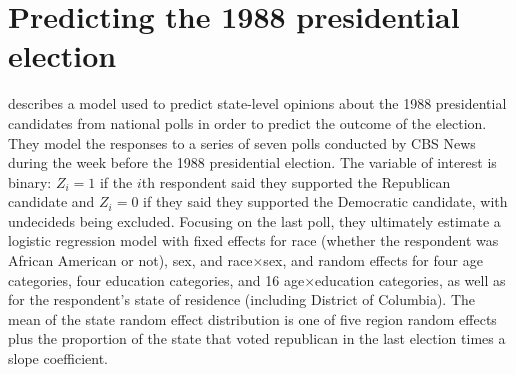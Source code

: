 \documentclass[12pt]{article}
\begin{document}
\section{Predicting the 1988 presidential election}\label{sec:pres}
\citet[Chapter~14]{gelman2006data} describes a model used to predict state-level opinions about the 1988 presidential candidates from national polls in order to predict the outcome of the election. They model the responses to a series of seven polls conducted by CBS News during the week before the 1988 presidential election. The variable of interest is binary: $Z_i=1$ if the $i$th respondent said they supported the Republican candidate and $Z_i=0$ if they said they supported the Democratic candidate, with undecideds being excluded. Focusing on the last poll, they ultimately estimate a logistic regression model with fixed effects for race (whether the respondent was African American or not), sex, and race$\times$sex, and random effects for four age categories, four education categories, and 16 age$\times$education categories, as well as for the respondent's state of residence (including District of Columbia). The mean of the state random effect distribution is one of five region random effects plus the proportion of the state that voted republican in the last election times a slope coefficient.
\end{document}
